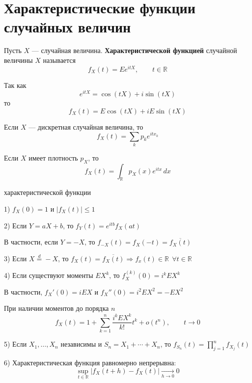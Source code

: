\documentclass[12pt,a4paper]{article}
\begin{document}
\newpage

\section{Характеристические функции случайных величин}

\begin{definition}

Пусть $X$ --- случайная величина. \textbf{Характеристической функцией} случайной величины $X$ называется
\[
f_X(t)
=
Ee^{itX},
\qquad
t\in\mathbb{R}
\]

Так как
\[
e^{itX}
=
\cos(tX)+i\sin(tX)
\]
то
\[
f_X(t)
=
E\cos(tX)+iE\sin(tX)
\]

Если $X$ --- дискретная случайная величина, то
\[
f_X(t)
=
\sum_k p_k e^{itx_k}
\]

Если $X$ имеет плотность $p_X$, то
\[
f_X(t)
=
\int_{\mathbb{R}}
p_X(x)e^{itx}\,dx
\]

\end{definition}

\begin{props}{характеристической функции}

1) $f_X(0)=1 $ и $|f_X(t)|\leq1$

\bigskip

2) Если $Y=aX+b$, то $f_Y(t) = e^{itb}f_X(at)$

В частности, если $Y=-X$, то $f_{-X}(t) =
f_X(-t) = \overline{f_X(t)}$

\bigskip

3) Если $X\overset{d}{=}-X$, то $f_X(t)=\overline{f_X(t)} \Longrightarrow f_x(t) \in \mathbb{R} \ \ \forall t\in\mathbb{R}$

\bigskip

4) Если существуют моменты $EX^k$, то $f_X^{(k)}(0) = i^kEX^k$

В частности, $f_X'(0)=iEX$ и $f_X''(0)=i^2EX^2=-EX^2$

При наличии моментов до порядка $n$
\[
f_X(t)
=
1+
\sum_{k=1}^n
\frac{i^kEX^k}{k!}t^k
+
o(t^n),
\qquad
t\to0
\]

\bigskip

5) Если $X_1,\ldots,X_n$ независимы и $S_n=X_1+\cdots+X_n$, 
то $f_{S_n}(t) = \prod_{j=1}^nf_{X_j}(t)$

\bigskip

6) Характеристическая функция равномерно непрерывна:
\[
\sup_{t\in\mathbb{R}}
|f_X(t+h)-f_X(t)|
\xrightarrow[h\to0]{}0
\]

\end{props}
\end{document}
